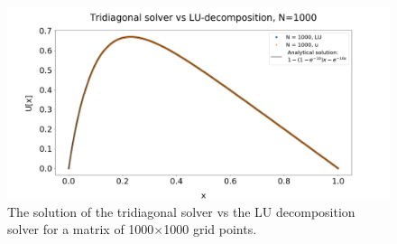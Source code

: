 \documentclass[%
reprint,
amsmath,amssymb,
aps,
]{revtex4-1}
\begin{document}
\begin{figure}
	\includegraphics[width=\textwidth]{N_LU_1000.png}
	\caption{The solution of the tridiagonal solver vs the LU decomposition solver for a matrix of 1000$\times$1000 grid points.}
	\label{N1000}
\end{figure}
\end{document}
